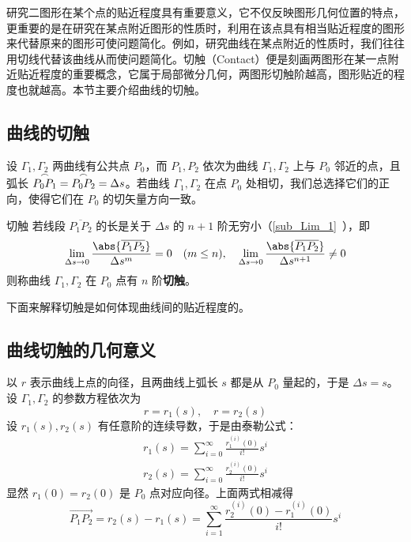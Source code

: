研究二图形在某个点的贴近程度具有重要意义，它不仅反映图形几何位置的特点，更重要的是在研究在某点附近图形的性质时，利用在该点具有相当贴近程度的图形来代替原来的图形可使问题简化。例如，研究曲线在某点附近的性质时，我们往往用切线代替该曲线从而使问题简化。切触（Contact）便是刻画两图形在某一点附近贴近程度的重要概念，它属于局部微分几何，两图形切触阶越高，图形贴近的程度也就越高。本节主要介绍曲线的切触。
\subsection{曲线的切触}
设 $\Gamma_1,\Gamma_2$ 两曲线有公共点 $P_0$，而 $P_1,P_2$ 依次为曲线 $\Gamma_1,\Gamma_2$ 上与 $P_0$ 邻近的点，且弧长 $\overset{\Huge\frown}{P_0P_1}=\overset{\Huge\frown}{P_0P_2}=\Delta s$。若曲线  $\Gamma_1,\Gamma_2$ 在点 $P_0$ 处相切，我们总选择它们的正向，使得它们在 $P_0$ 的切矢量方向一致。
\begin{definition}{切触}\label{def_CofCur_1}
若线段 $\overline{P_1P_2}$ 的长是关于 $\Delta s$ 的 $n+1$ 阶无穷小（\autoref{sub_Lim_1}~），即
\begin{equation}
\lim_{\Delta s\rightarrow0}\frac{\abs{\overline{P_1P_2}}}{\Delta s^{m}}=0\quad(m\leq n),\quad\lim_{\Delta s\rightarrow0}\frac{\abs{\overline{P_1P_2}}}{\Delta s^{n+1}}\neq0
\end{equation}
则称曲线 $\Gamma_1,\Gamma_2$ 在 $P_0$ 点有 $n$ 阶\textbf{切触}。
\end{definition}
下面来解释切触是如何体现曲线间的贴近程度的。
\subsection{曲线切触的几何意义}
以 $r$ 表示曲线上点的向径，且两曲线上弧长 $s$ 都是从 $P_0$ 量起的，于是 $\Delta s=s$。设 $\Gamma_1,\Gamma_2$ 的参数方程依次为
\begin{equation}
r=r_1(s),\quad r=r_2(s)
\end{equation}
设 $r_1(s),r_2(s)$ 有任意阶的连续导数，于是由泰勒公式：
\begin{equation}
\begin{aligned}
r_1(s)=\sum_{i=0}^\infty \frac{r^{(i)}_1(0)}{i!}s^i\\
r_2(s)=\sum_{i=0}^\infty \frac{r^{(i)}_2(0)}{i!}s^i
\end{aligned}
\end{equation}
显然 $r_1(0)=r_2(0)$ 是 $P_0$ 点对应向径。上面两式相减得
\begin{equation}\label{eq_CofCur_1}
\overrightarrow{P_1P_2}=r_2(s)-r_1(s)=\sum_{i=1}^\infty \frac{r^{(i)}_2(0)-r^{(i)}_1(0)}{i!}s^i
\end{equation}

